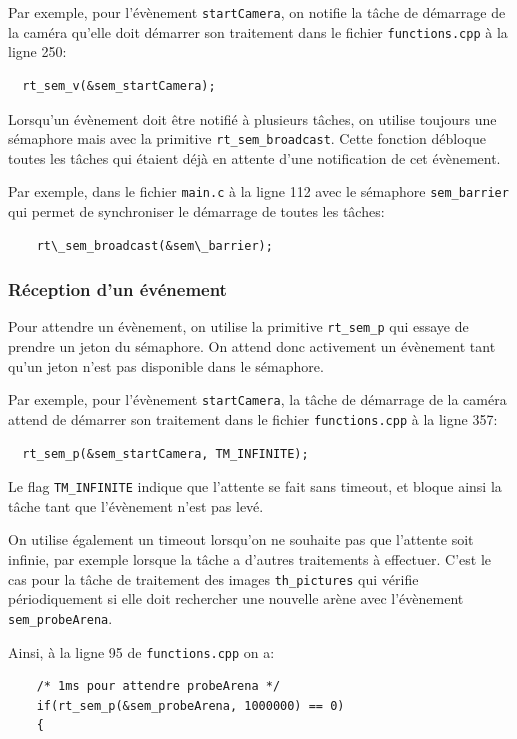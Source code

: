 \documentclass[11pt, a4paper]{paper}
\begin{document}
Par exemple, pour l'évènement {\tt startCamera}, on notifie la tâche de démarrage de la caméra qu'elle doit démarrer son traitement dans le fichier {\tt functions.cpp} à la ligne 250:
\begin{verbatim}
  rt_sem_v(&sem_startCamera);
\end{verbatim}

Lorsqu'un évènement doit être notifié à plusieurs tâches, on utilise toujours une sémaphore mais avec la primitive {\tt rt\_sem\_broadcast}. Cette fonction débloque toutes les tâches qui étaient déjà en attente d'une notification de cet évènement.

Par exemple, dans le fichier {\tt main.c} à la ligne 112 avec le sémaphore {\tt sem\_barrier} qui permet de synchroniser le démarrage de toutes les tâches:
\begin{verbatim}
    rt\_sem_broadcast(&sem\_barrier);
\end{verbatim}

\subsubsection{Réception d’un événement}
Pour attendre un évènement, on utilise la primitive {\tt rt\_sem\_p} qui essaye de prendre un jeton du sémaphore. On attend donc activement un évènement tant qu'un jeton n'est pas disponible dans le sémaphore.

Par exemple, pour l'évènement {\tt startCamera}, la tâche de démarrage de la caméra attend de démarrer son traitement dans le fichier {\tt functions.cpp} à la ligne 357:
\begin{verbatim}
  rt_sem_p(&sem_startCamera, TM_INFINITE);
\end{verbatim}

Le flag {\tt TM\_INFINITE} indique que l'attente se fait sans timeout, et bloque ainsi la tâche tant que l'évènement n'est pas levé.

On utilise également un timeout lorsqu'on ne souhaite pas que l'attente soit infinie, par exemple lorsque la tâche a d'autres traitements à effectuer. C'est le cas pour la tâche de traitement des images {\tt th\_pictures} qui vérifie périodiquement si elle doit rechercher une nouvelle arène avec l'évènement {\tt sem\_probeArena}.

Ainsi, à la ligne 95 de {\tt functions.cpp} on a:
\begin{verbatim}
    /* 1ms pour attendre probeArena */
    if(rt_sem_p(&sem_probeArena, 1000000) == 0)
    {
\end{verbatim}
\end{document}
